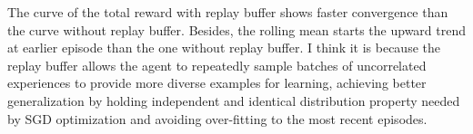 \documentclass[11pt,addpoints,answers]{exam}
\begin{document}
\begin{questions}
\begin{parts}
    \begin{your_solution}[title=Comment,height=5cm]
        The curve of the total reward with replay buffer shows faster convergence than the curve without replay buffer. Besides, the rolling mean starts the upward trend at earlier episode than the one without replay buffer. I think it is because the replay buffer allows the agent to repeatedly sample batches of uncorrelated experiences to provide more diverse examples for learning, achieving better generalization by holding independent and identical distribution property needed by SGD optimization and avoiding over-fitting to the most recent episodes.        
    \end{your_solution}
    

\end{parts}
\end{questions}
\end{document}
